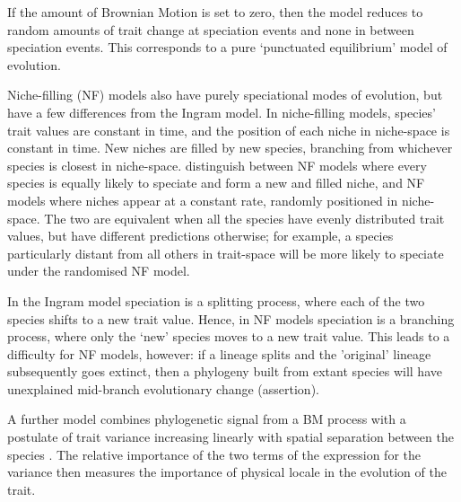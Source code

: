 \documentclass[12pt]{article}
\begin{document}
If the amount of Brownian Motion is set to zero, then the \cite{ingram_speciation_2010} model reduces to random amounts of trait change at speciation events and none in between speciation events. 
This corresponds to a pure `punctuated equilibrium' model of evolution.

Niche-filling (NF) models \citep{freckleton_detecting_2006,price_correlated_1997,harvey_comparative_2000} also have purely speciational modes of evolution, but have a few differences from the Ingram model. 
In niche-filling models, species' trait values are constant in time, and the position of each niche in niche-space is constant in time. 
New niches are filled by new species, branching from whichever species is closest in niche-space. 
\citet{freckleton_detecting_2006} distinguish between NF models where every species is equally likely to speciate and form a new and filled niche, and NF models where niches appear at a constant rate, randomly positioned in niche-space. 
The two are equivalent when all the species have evenly distributed trait values, but have different predictions otherwise; for example, a species particularly distant from all others in trait-space will be more likely to speciate under the randomised NF model.

In the Ingram model speciation is a splitting process, where each of the two species shifts to a new trait value. 
Hence, in NF models speciation is a branching process, where only the `new' species moves to a new trait value. 
This leads to a difficulty for NF models, however: if a lineage splits and the 'original' lineage subsequently goes extinct, then a phylogeny built from extant species will have unexplained mid-branch evolutionary change (assertion).

A further model combines phylogenetic signal from a BM process with a postulate of trait variance increasing linearly with spatial separation between the species \citep{freckleton_space_2009}. 
The relative importance of the two terms of the expression for the variance then measures the importance of physical locale in the evolution of the trait.
\end{document}
